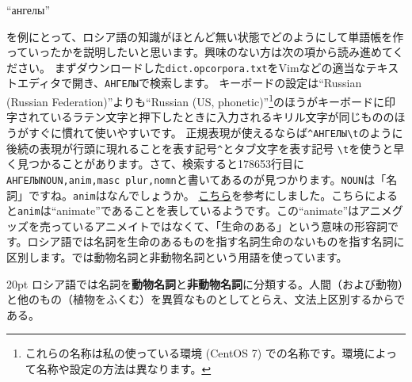 \documentclass[12pt]{ltjsarticle}
\begin{document}
\begin{russian}``ангелы''\end{russian}を例にとって、ロシア語の知識がほとんど無い状態でどのようにして単語帳を作っていったかを説明したいと思います。興味のない方は次の項から読み進めてください。
まずダウンロードした\texttt{dict.opcorpora.txt}をVimなどの適当なテキストエディタで開き、\texttt{АНГЕЛЫ}で検索します。
キーボードの設定は``Russian (Russian Federation)''よりも``Russian (US, phonetic)''\footnote{これらの名称は私の使っている環境 (CentOS 7) での名称です。環境によって名称や設定の方法は異なります。}のほうがキーボードに印字されているラテン文字と押下したときに入力されるキリル文字が同じもののほうがすぐに慣れて使いやすいです。
正規表現が使えるならば\texttt{\^}\texttt{АНГЕЛЫ\textbackslash{}t}のように 後続の表現が行頭に現れることを表す記号\texttt{\^}とタブ文字を表す記号 \texttt{\textbackslash{}t}を使うと早く見つかることがあります。さて、検索すると178653行目に\texttt{АНГЕЛЫNOUN,anim,masc plur,nomn}と書いてあるのが見つかります。\texttt{NOUN}は「名詞」ですね。\texttt{anim}はなんでしょうか。
\href{http://www.ruscorpora.ru/en/corpora-morph.html}{こちら}を参考にしました。こちらによると\texttt{anim}は``animate''であることを表しているようです。この``animate''はアニメグッズを売っているアニメイトではなくて、「生命のある」という意味の形容詞です。ロシア語では名詞を生命のあるものを指す名詞生命のないものを指す名詞に区別します。\citep{uda2009}では動物名詞と非動物名詞という用語を使っています。

\bigskip

\begin{indentation}{2\zw}{0pt}
\noindent ロシア語では名詞を\textbf{動物名詞}と\textbf{非動物名詞}に分類する。人間（および動物）と他のもの（植物をふくむ）を異質なものとしてとらえ、文法上区別するからである。
\end{indentation}

\bigskip
\end{document}
